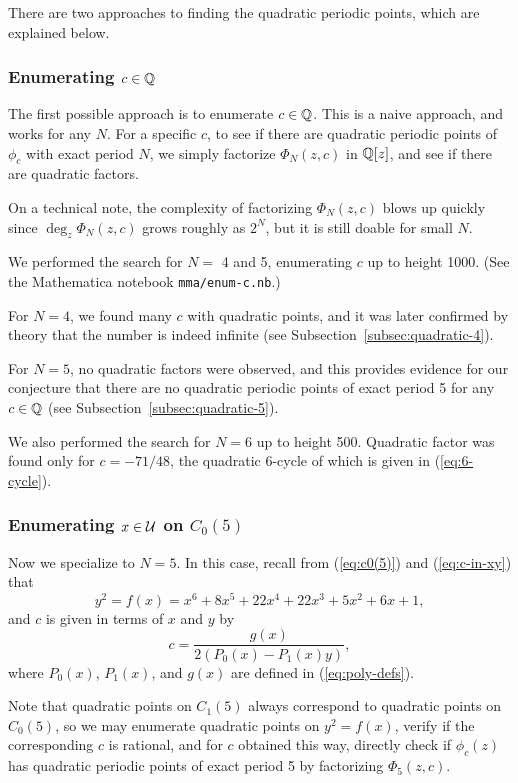 There are two approaches to finding the quadratic periodic points,
which are explained below.

\subsubsection{Enumerating $c \in \mathbb{Q}$}

The first possible approach is to enumerate $c \in \mathbb{Q}$. This is a
naive approach, and works for any $N$. For a specific $c$, to see if
there are quadratic periodic points of $\phi_c$ with exact period $N$,
we simply factorize $\Phi_N(z, c)$ in $\mathbb{Q}[z]$, and see if there are
quadratic factors.

On a technical note, the complexity of factorizing $\Phi_N(z, c)$
blows up quickly since $\deg_z \Phi_N(z, c)$ grows roughly as $2^N$,
but it is still doable for small $N$.

We performed the search for $N =$ 4 and 5, enumerating $c$ up to
height 1000. (See the Mathematica notebook \texttt{mma/enum-c.nb}.)

For $N = 4$, we found many $c$ with quadratic points, and it was later
confirmed by theory that the number is indeed infinite (see
Subsection~\ref{subsec:quadratic-4}).

For $N=5$, no quadratic factors were observed, and this provides
evidence for our conjecture that there are no quadratic periodic
points of exact period 5 for any $c \in \mathbb{Q}$ (see
Subsection~\ref{subsec:quadratic-5}).

We also performed the search for $N = 6$ up to height 500. Quadratic
factor was found only for $c = -71/48$, the quadratic 6-cycle of which
is given in (\ref{eq:6-cycle}).

\subsubsection{Enumerating $x \in \mathcal{U}$ on $C_0(5)$}

Now we specialize to $N = 5$. In this case, recall from
(\ref{eq:c0(5)}) and (\ref{eq:c-in-xy}) that
\[
y^2 = f(x) = x^6 + 8x^5 + 22x^4 + 22x^3 + 5x^2 + 6x + 1,
\]
and $c$ is given in terms of $x$ and $y$ by
\[
c = \frac{g(x)}{2(P_0(x) - P_1(x) y)},
\]
where $P_0(x)$, $P_1(x)$, and $g(x)$ are defined in
(\ref{eq:poly-defs}).

Note that quadratic points on $C_1(5)$ always correspond to quadratic
points on $C_0(5)$, so we may enumerate quadratic points on $y^2 =
f(x)$, verify if the corresponding $c$ is rational, and for $c$
obtained this way, directly check if $\phi_c(z)$ has quadratic
periodic points of exact period 5 by factorizing $\Phi_5(z, c)$.

